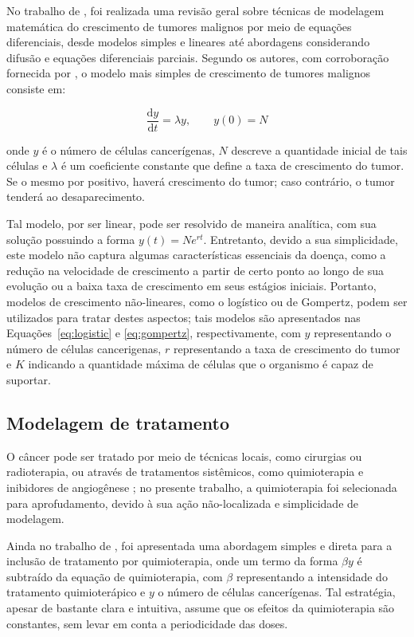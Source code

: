 \documentclass[12pt]{article}
\begin{document}
No trabalho de \cite{Enderling2014}, foi realizada uma revisão geral sobre técnicas de modelagem matemática do crescimento de tumores malignos por meio de equações diferenciais, desde modelos simples e lineares até abordagens considerando difusão e equações diferenciais parciais. Segundo os autores, com corroboração fornecida por \cite{Sachs2001}, o modelo mais simples de crescimento de tumores malignos consiste em:

\begin{equation} \label{eq:linear}
  \frac{\mathrm{d} y}{\mathrm{d} t} = \lambda y, \qquad y(0) = N
\end{equation}

\noindent onde $y$ é o número de células cancerígenas, $N$ descreve a quantidade inicial de tais células e $\lambda$ é um coeficiente constante que define a taxa de crescimento do tumor. Se o mesmo por positivo, haverá crescimento do tumor; caso contrário, o tumor tenderá ao desaparecimento.

Tal modelo, por ser linear, pode ser resolvido de maneira analítica, com sua solução possuindo a forma $y(t) = N e^{r t}$. Entretanto, devido a sua simplicidade, este modelo não captura algumas características essenciais da doença, como a redução na velocidade de crescimento a partir de certo ponto ao longo de sua evolução ou a baixa taxa de crescimento em seus estágios iniciais. Portanto, modelos de crescimento não-lineares, como o logístico ou de Gompertz, podem ser utilizados para tratar destes aspectos; tais modelos são apresentados nas Equações~\ref{eq:logistic} e \ref{eq:gompertz}, respectivamente, com $y$ representando o número de células cancerigenas, $r$ representando a taxa de crescimento do tumor e $K$ indicando a quantidade máxima de células que o organismo é capaz de suportar.

\subsection{Modelagem de tratamento} \label{sec:treatment}

O câncer pode ser tratado por meio de técnicas locais, como cirurgias ou radioterapia, ou através de tratamentos sistêmicos, como quimioterapia e inibidores de angiogênese \cite{Sanga2006}; no presente trabalho, a quimioterapia foi selecionada para aprofudamento, devido à sua ação não-localizada e simplicidade de modelagem.

Ainda no trabalho de \cite{Enderling2014}, foi apresentada uma abordagem simples e direta para a inclusão de tratamento por quimioterapia, onde um termo da forma $\beta y$ é subtraído da equação de quimioterapia, com $\beta$ representando a intensidade do tratamento quimioterápico e $y$ o número de células cancerígenas. Tal estratégia, apesar de bastante clara e intuitiva, assume que os efeitos da quimioterapia são constantes, sem levar em conta a periodicidade das doses.
\end{document}
